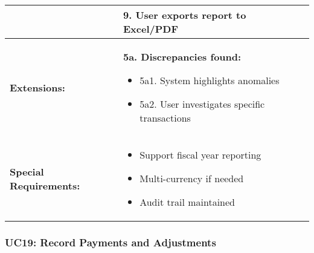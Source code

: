 \documentclass[12pt]{article}
\begin{document}
\begin{longtable}{|p{3cm}|p{11cm}|}
& 9. User exports report to Excel/PDF \\
\hline
\textbf{Extensions:} & 
\textbf{5a. Discrepancies found:}
\begin{itemize}
    \item 5a1. System highlights anomalies
    \item 5a2. User investigates specific transactions
\end{itemize} \\
\hline
\textbf{Special Requirements:} & 
\begin{itemize}
    \item Support fiscal year reporting
    \item Multi-currency if needed
    \item Audit trail maintained
\end{itemize} \\
\hline
\end{longtable}


\subsubsection{UC19: Record Payments and Adjustments}
\end{document}

